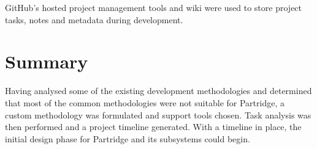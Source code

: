 GitHub's hosted project management tools and wiki were used to store project
tasks, notes and metadata during development.

\section{Summary}

Having analysed some of the existing development methodologies and determined
that most of the common methodologies were not suitable for Partridge, a custom
methodology was formulated and support tools chosen. Task analysis was then
performed and a project timeline generated. With a timeline in place, the
initial design phase for Partridge and its subsystems could begin.
